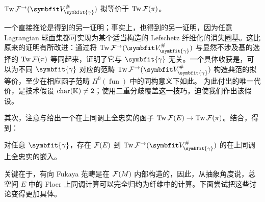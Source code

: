 \begin{theorem}\label{st:18.24}
$\Tw\F^\to(\symbfit V_{\symbfit{\gamma}}^\#)$ 拟等价于 $\operatorname{Tw}\mathcal F(\pi)$。
\end{theorem}

一个直接推论是得到的另一证明；事实上，也得到的另一证明，因为任意 Lagrangian 球面集都可实现为某个适当构造的 Lefschetz 纤维化的消失圈基。这比原来的证明有所改进：通过将 $\Tw\F^\to(\symbfit V_{\symbfit{\gamma}}^\#)$ 与显然不涉及基的选择的 $\operatorname{Tw}\mathcal F(\pi)$ 等同起来，证明了它与 $\symbfit{\gamma}$ 无关。一个具体收获是，可以为不同 $\symbfit{\gamma}$ 对应的范畴 $\Tw\F^\to(\symbfit V_{\symbfit{\gamma}}^\#)$ 构造典范的拟等价，至少在相应函子范畴 $H^0(\operatorname{fun})$ 中的同构意义下如此。
为此付出的唯一代价，是技术假设 $\operatorname{char}(\mathbb K)\ne2$；使用二重分歧覆盖这一技巧，迫使我们作出该假设。

其次，注意与给出一个在上同调上全忠实的函子 $\operatorname{Tw}\mathcal F(E)\to\operatorname{Tw}\mathcal F(\pi)$。结合，得到：
\begin{corollary}\label{st:18.25}
对任意 $\symbfit{\gamma}$，存在 $\mathcal F(E)$ 到 $\Tw\F^\to(\symbfit V_{\symbfit{\gamma}}^\#)$ 的在上同调上全忠实的嵌入。
\end{corollary}

关键在于，有向 Fukaya 范畴是在 $\mathcal F(M)$ 内部构造的，因此，从抽象角度说，总空间 $E$ 中的 Floer 上同调计算可以完全归约为纤维中的计算。下面尝试把这些讨论变得更加具体。
